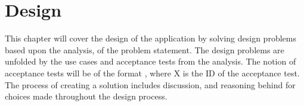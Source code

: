 \chapter{Design}
\label{chapter:design}
This chapter will cover the design of the application by solving design problems based upon the analysis, of the problem statement.
The design problems are unfolded by the use cases and acceptance tests from the analysis.
The notion of acceptance tests will be of the format , where X is the ID of the acceptance test.
The process of creating a solution includes discussion, and reasoning behind for choices made throughout the design process.










